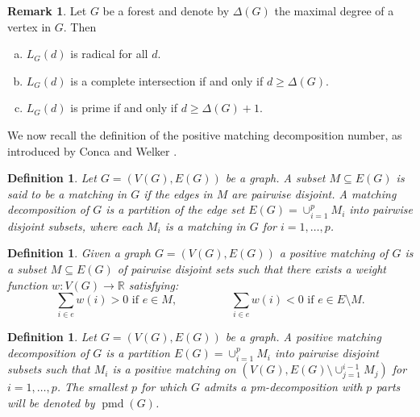 \documentclass[11pt,a4paper,reqno]{amsart}
\newtheorem{definition}[thm]{Definition}
\theoremstyle{definition}
\newtheorem{remark}[thm]{Remark}
\numberwithin{equation}{section}
\DeclareMathOperator{\pmd}{pmd}
\begin{document}
\begin{remark} \cite[Theorem 1.5]{CW2019} \label{R,CI,Prime} Let $G$ be a forest and denote by $\Delta(G)$ the maximal degree of a vertex in $G$. Then
\begin{enumerate}[(a)]
    \item $L_G(d)$ is radical for all $d$.
    \item $L_G(d)$ is a complete intersection if and only if $d \geq \Delta(G)$.
    \item $L_G(d)$ is prime if and only if $d \geq \Delta(G) +1$.
\end{enumerate}
\end{remark}

We now recall the definition of the positive matching decomposition number, as introduced by  Conca and Welker \cite{CW2019}. 

\begin{definition}
Let $G=(V(G),E(G))$ be a graph. A subset $M \subseteq E(G)$ is said to be a matching in $G$  if the edges in $M$ are pairwise disjoint. A matching decomposition of $G$ is a partition of the edge set $E(G)=\cup_{i=1}^{p} M_i$ into pairwise disjoint subsets, where each $M_i$ is a matching in $G$ for $i = 1,\ldots,p$. 
\end{definition}


\begin{definition} \cite[Definition 5.1]{CW2019}
    Given a graph $G=(V(G),E(G))$ a positive matching of $G$ is a subset $M \subseteq E(G)$ of pairwise disjoint sets such that there exists a weight function $w : V(G) \rightarrow \mathbb{R}$ satisfying:
    \begin{equation*}
      \sum_{i\in e} w(i)>0 \text{ if } e \in M, \hspace{2cm} \sum_{i\in e} w(i)<0 \text{ if } e \in E\setminus M. 
    \end{equation*}
\end{definition}




\begin{definition} \cite[Definition 5.3]{CW2019}
Let $G=(V(G),E(G))$ be a graph. A positive matching decomposition of $G$ is a partition $E(G) = \cup_{i=1}^{p} M_i$ into pairwise disjoint subsets such that $M_i$ is a positive matching on $(V(G), E(G) \setminus \cup_{j=1}^{i-1} M_j)$ for $i = 1,\ldots,p$. 
The smallest $p$ for which $G$ admits a pm-decomposition with $p$ parts will be denoted by $\pmd(G)$.
\end{definition}
\end{document}
